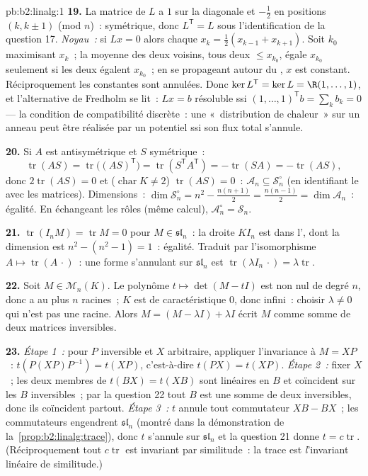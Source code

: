 \begin{solution}{pb:b2:linalg:1}
\textbf{19.} La matrice de $L$ a $1$ sur la diagonale et
$-\frac12$ en positions $(k, k\pm1)$ (mod $n$)~: symétrique, donc
$L^{\mathsf T} = L$ sous l'identification de la question 17.
\emph{Noyau~:} si $Lx = 0$ alors chaque $x_k = \frac12(x_{k-1} +
x_{k+1})$. Soit $k_0$ maximisant $x_k$~; la moyenne des deux
voisins, tous deux $\leq x_{k_0}$, égale $x_{k_0}$ seulement si les deux
égalent $x_{k_0}$~; en se propageant autour du , $x$ est constant.
Réciproquement les constantes sont annulées. Donc $\ker L^{\mathsf T} = \ker L
= \R(1, \dots, 1)$, et l'alternative de Fredholm se lit~: $Lx = b$
résoluble ssi $(1,\dots,1)^{\mathsf T} b = \sum_k b_k = 0$ ---
la condition de compatibilité discrète~: une «~distribution de chaleur~»
sur un anneau peut être réalisée par un potentiel ssi son flux total
s'annule.

\textbf{20.} Si $A$ est antisymétrique et $S$ symétrique~:
\[
\operatorname{tr}(AS) = \operatorname{tr}\bigl((AS)^{\mathsf
T}\bigr) = \operatorname{tr}(S^{\mathsf T}A^{\mathsf T}) =
-\operatorname{tr}(SA) = -\operatorname{tr}(AS),
\]
donc $2\operatorname{tr}(AS) = 0$ et ($\operatorname{char} K \neq
2$) $\operatorname{tr}(AS) = 0$~: $\mathcal{A}_n \subseteq
\mathcal{S}_n^\circ$ (en identifiant le  avec les matrices).
Dimensions~: $\dim\mathcal{S}_n^\circ = n^2 - \frac{n(n+1)}2 =
\frac{n(n-1)}2 = \dim\mathcal{A}_n$~: égalité. En échangeant les rôles
(même calcul), $\mathcal{A}_n^\circ = \mathcal{S}_n$.

\textbf{21.} $\operatorname{tr}(I_nM) = \operatorname{tr} M = 0$
pour $M \in \mathfrak{sl}_n$~: la droite $KI_n$ est dans
l', dont la dimension est $n^2 - (n^2 - 1) = 1$~: égalité.
Traduit par l'isomorphisme $A \mapsto
\operatorname{tr}(A\,\cdot)$~: une forme s'annulant sur
$\mathfrak{sl}_n$ est $\operatorname{tr}(\lambda I_n\,\cdot) =
\lambda\operatorname{tr}$.

\textbf{22.} Soit $M \in \mathcal{M}_n(K)$. Le polynôme $t
\mapsto \det(M - tI)$ est non nul de degré $n$, donc a au plus
$n$ racines~; $K$ est de caractéristique $0$, donc infini~: choisir
$\lambda \neq 0$ qui n'est pas une racine. Alors $M = (M - \lambda I) +
\lambda I$ écrit $M$ comme somme de deux matrices inversibles.

\textbf{23.} \emph{Étape 1~:} pour $P$ inversible et $X$ arbitraire,
appliquer l'invariance à $M = XP$~: $t(P(XP)P^{-1}) = t(XP)$,
c'est-à-dire $t(PX) = t(XP)$. \emph{Étape 2~:} fixer $X$~; les deux membres de
$t(BX) = t(XB)$ sont linéaires en $B$ et coïncident sur les $B$ inversibles~;
par la question 22 tout $B$ est une somme de deux inversibles, donc ils
coïncident partout. \emph{Étape 3~:} $t$ annule tout commutateur $XB
- BX$~; les commutateurs engendrent $\mathfrak{sl}_n$ (montré dans la
démonstration de la~\cref{prop:b2:linalg:trace}), donc $t$ s'annule sur
$\mathfrak{sl}_n$ et la question 21 donne $t =
c\operatorname{tr}$. (Réciproquement tout $c\operatorname{tr}$ est
invariant par similitude~: la trace est \emph{l}'invariant linéaire de
similitude.)


\end{solution}

